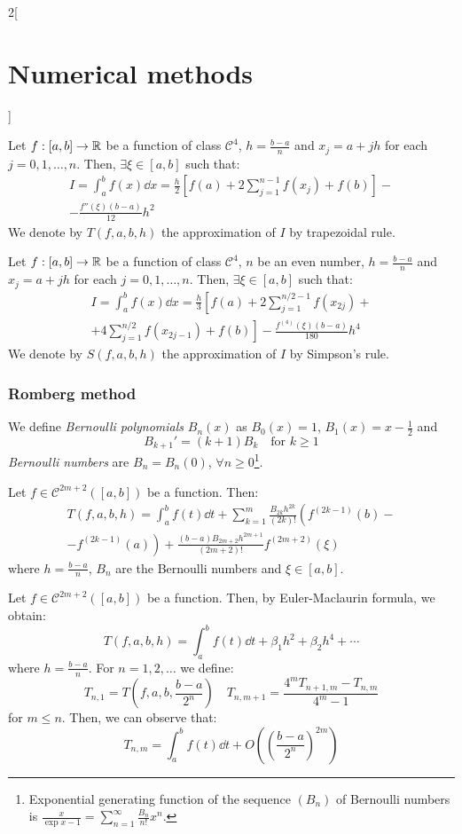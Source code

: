 \documentclass[../../../main.tex]{subfiles}
\begin{document}
\begin{multicols}{2}[\section{Numerical methods}]
\begin{theorem}
        Let $f:[a,b]\rightarrow\mathbb{R}$ be a function of class $\mathcal{C}^4$, $h=\frac{b-a}{n}$ and $x_j=a+jh$ for each $j=0,1,\ldots,n$. Then, $\exists\xi\in[a,b]$ such that:
        \begin{multline*}
            I=\int_a^bf(x)\dd x=\frac{h}{2}\left[f(a)+2\sum_{j=1}^{n-1}f(x_j)+f(b)\right]-\\-\frac{f''(\xi)(b-a)}{12}h^2
        \end{multline*}
        We denote by $T(f,a,b,h)$ the approximation of $I$ by trapezoidal rule.
    \end{theorem}
    \begin{theorem}
        Let $f:[a,b]\rightarrow\mathbb{R}$ be a function of class $\mathcal{C}^4$, $n$ be an even number, $h=\frac{b-a}{n}$ and $x_j=a+jh$ for each $j=0,1,\ldots,n$. Then, $\exists\xi\in[a,b]$ such that:
        \begin{multline*}
            I=\int_a^bf(x)\dd x=\frac{h}{3}\left[f(a)+2\sum_{j=1}^{n/2-1}f(x_{2j})\right.+\\+\left.4\sum_{j=1}^{n/2}f(x_{2j-1})+f(b)\right]-\frac{f^{(4)}(\xi)(b-a)}{180}h^4
        \end{multline*}
        We denote by $S(f,a,b,h)$ the approximation of $I$ by Simpson's rule.
    \end{theorem}
    \subsubsection*{Romberg method}
    \begin{definition}
        We define \textit{Bernoulli polynomials} $B_n(x)$ as $B_0(x)=1$, $B_1(x)=x-\frac{1}{2}$ and $$B_{k+1}'=(k+1)B_k\quad\text{for }k\geq 1$$ \textit{Bernoulli numbers} are $B_n=B_n(0)$, $\forall n\geq 0$\footnote{Exponential generating function of the sequence $(B_n)$ of Bernoulli numbers is $\displaystyle\frac{x}{\exp{x}-1}=\sum_{n=1}^\infty\frac{B_n}{n!}x^n$.}.
    \end{definition}
    \begin{theorem}
        Let $f\in\mathcal{C}^{2m+2}([a,b])$ be a function. Then:
        \begin{multline*}
            T(f,a,b,h)=\int_a^bf(t)\dd t+\sum_{k=1}^m\frac{B_{2k}h^{2k}}{(2k)!}\left(f^{(2k-1)}(b)\right.-\\-\left.f^{(2k-1)}(a)\right)+\frac{(b-a)B_{2m+2}h^{2m+1}}{(2m+2)!}f^{(2m+2)}(\xi)
        \end{multline*}
        where $h=\frac{b-a}{n}$, $B_n$ are the Bernoulli numbers and $\xi\in[a,b]$.
    \end{theorem}
    \begin{theorem}
        Let $f\in\mathcal{C}^{2m+2}([a,b])$ be a function. Then, by Euler-Maclaurin formula, we obtain: $$T(f,a,b,h)=\int_a^bf(t)\dd t+\beta_1 h^2+\beta_2 h^4+\cdots$$ where $h=\frac{b-a}{n}$. For $n=1,2,\ldots$ we define: $$T_{n,1}=T\left(f,a,b,\frac{b-a}{2^n}\right)\quad T_{n,m+1}=\frac{4^mT_{n+1,m}-T_{n,m}}{4^m-1}$$ for $m\leq n$. Then, we can observe that: $$T_{n,m}=\int_a^bf(t)\dd t+O\left(\left(\frac{b-a}{2^n}\right)^{2m}\right)$$
    \end{theorem}

\end{multicols}
\end{document}
